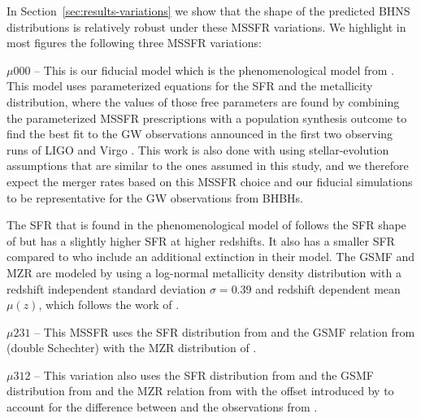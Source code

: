 \documentclass[twocolumn]{aastex63}
\newcommand\bhnsSingle{BHNS\xspace}
\begin{document}
In Section~\ref{sec:results-variations} we show that the shape of the predicted \bhnsSingle distributions is relatively robust under these \ac{MSSFR} variations. We highlight in most figures the following three \ac{MSSFR} variations:

$\mathit{{\mu000}}$ --  This is our fiducial model which is the  phenomenological model from \citet{2019MNRAS.490.3740N}. This  model uses parameterized  equations for the \ac{SFR}  and the metallicity distribution, where the values of those free parameters  are found by combining the parameterized  \ac{MSSFR} prescriptions with a population synthesis outcome to find the  best fit to the \ac{GW} observations announced in the first two observing runs of LIGO and Virgo   \citep{2019MNRAS.490.3740N}. This work is also done with  {} using stellar-evolution assumptions that are similar to the ones assumed in this study, and we therefore expect the merger rates based on this \ac{MSSFR} choice and our fiducial simulations to be representative for the \ac{GW} observations from \acp{BHBH}. 

The  \ac{SFR}  that is found in the phenomenological model of \citet{2019MNRAS.490.3740N} follows the \ac{SFR}  shape of  \citet{2014ARA&A..52..415M, 2017ApJ...840...39M} but has a slightly higher \ac{SFR}  at higher redshifts. It also has a smaller \ac{SFR}  compared to \citet{2004ApJ...613..200S} who include an additional extinction in their model.  The  \ac{GSMF} and \ac{MZR}  are modeled by using a log-normal metallicity density distribution with a redshift independent standard deviation 
  $\sigma=0.39$  and  redshift dependent  mean $\mu(z)$, which follows the work of  \citet{2006ApJ...638L..63L}. 
  

$\mathit{{\mu231}}$ -- This \ac{MSSFR}  uses the  \ac{SFR}   distribution from \citet{2004ApJ...613..200S}	 and  the \ac{GSMF} 		relation from  \citet{2015MNRAS.450.4486F}  (double Schechter) with the \ac{MZR} distribution of \citet{2006ApJ...638L..63L}. 

$\mathit{{\mu312}}$ -- This variation also uses the \ac{SFR}  distribution from \citet{2017ApJ...840...39M}  and the \ac{GSMF} distribution from \citet{2004MNRAS.355..764P} and the \ac{MZR} relation from \citet{2006ApJ...638L..63L} with the offset introduced by \citet{2019MNRAS.490.3740N} to account for the difference between   \citet{2006ApJ...638L..63L} and the observations from \citet{2005ApJ...635..260S}. 
\end{document}
